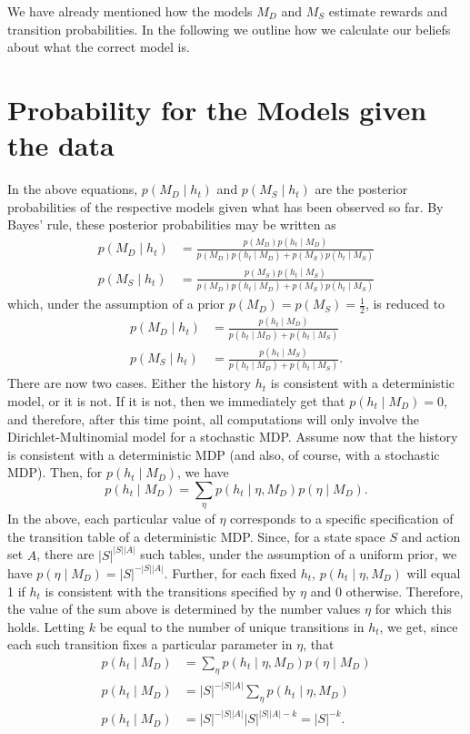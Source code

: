 \documentclass{scrartcl}
\begin{document}
We have already mentioned how the models $M_D$ and $M_S$ estimate rewards and transition probabilities. In the following we outline how we calculate our beliefs about what the correct model is.

\section{Probability for the Models given the data}
In the above equations, $p(M_D \mid h_t )$ and $p(M_S \mid h_t )$ are the posterior probabilities of the respective models given what has been observed so far. By Bayes' rule, these posterior probabilities may be written as
\begin{align*}
p(M_D \mid h_t) & = \frac{p(M_D) p(h_t \mid M_D)}{p(M_D) p(h_t \mid M_D) + p(M_S) p(h_t \mid M_S)} \\
p(M_S \mid h_t) & = \frac{p(M_S) p(h_t \mid M_S)}{p(M_D) p(h_t \mid M_D) + p(M_S) p(h_t \mid M_S)}
\end{align*}
which, under the assumption of a prior $p(M_D) = p(M_S) = \frac{1}{2}$, is reduced to
\begin{align*}
p(M_D \mid h_t ) & = \frac{p(h_t \mid M_D)}{p(h_t \mid M_D) + p(h_t \mid M_S)} \\
p(M_S \mid h_t ) & = \frac{p(h_t \mid M_S)}{p(h_t \mid M_D) + p(h_t \mid M_S)} .
\end{align*}
There are now two cases. Either the history $h_t$ is consistent with a deterministic model, or it is not. If it is not, then we immediately get that $p(h_t \mid M_D) = 0$, and therefore, after this time point, all computations will only involve the Dirichlet-Multinomial model for a stochastic MDP. Assume now that the history is consistent with a deterministic MDP (and also, of course, with a stochastic MDP). Then, for $p(h_t \mid M_D)$, we have
\begin{equation*}
p(h_t \mid M_D) = \sum_{\eta} p(h_t \mid \eta, M_D) p(\eta \mid M_D) .
\end{equation*}
In the above, each particular value of $\eta$ corresponds to a specific specification of the transition table of a deterministic MDP. Since, for a state space $S$ and action set $A$, there are $|S|^{|S||A|}$ such tables, under the assumption of a uniform prior, we have $p(\eta \mid M_D) = |S|^{-|S||A|}$. Further, for each fixed $h_t$, $p(h_t \mid \eta, M_D)$ will equal 1 if $h_t$ is consistent with the transitions specified by $\eta$ and 0 otherwise. Therefore, the value of the sum above is determined by the number values $\eta$ for which this holds. Letting $k$ be equal to the number of unique transitions in $h_t$, we get, since each such transition fixes a particular parameter in $\eta$, that 
\begin{align*}
p(h_t \mid M_D) & = \sum_{\eta} p(h_t \mid \eta, M_D) p(\eta \mid M_D) \\
p(h_t \mid M_D) & = |S|^{-|S||A|} \sum_{\eta} p(h_t \mid \eta, M_D) \\
p(h_t \mid M_D) & = |S|^{-|S||A|} |S|^{|S||A| - k} = |S|^{-k} .
\end{align*}
\end{document}
